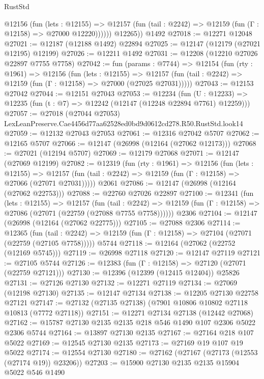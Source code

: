 \begin{lexlean}{RustStd}
\begin{coremodule}
            @12156
              (fun (lets : @12155) =>
              @12157 (fun (tail : @2242) => @12159 (fun (Γ : @12158) => @27000 @12220))))))
        @12265))
    @1492
@27018 := @12271 @12048
@27021 := @12187 (@12188 @1492) @22894
@27025 := @12147 (@12179 (@27021 @12195) @12199)
@27026 := @12211 @1492
@27031 := @12208 (@12210 @27026 @22897 @7755 @7758)
@27042 := fun (params : @7744) =>
  @12154
    (fun (rty : @1961) =>
    @12156
      (fun (lets : @12155) =>
      @12157 (fun (tail : @2242) => @12159 (fun (Γ : @12158) => @27000 (@27025 @27031)))))
@27043 := @12153 @27042
@27044 := @12151 @27043
@27053 := @12234
    (fun (U : @12233) => @12235 (fun (t : @7) => @12242 (@12147 (@12248 @22894 @7761) @12259)))
@27057 := @27018
    (@27044 @27053)
    LexLeanPreserve.Cae4456d77aa62528ed0bd9d0612cd278.R50.RustStd.look14
@27059 := @12132 @27043 @27053
@27061 := @12316 @27042 @5707
@27062 := @12165 @5707
@27066 := @12147 (@26998 (@12164 (@27062 @12173)))
@27068 := @27021 (@12194 @5707)
@27069 := @12179 @27068
@27071 := @12147 (@27069 @12199)
@27082 := @12319
    (fun (rty : @1961) =>
    @12156
      (fun (lets : @12155) =>
      @12157 (fun (tail : @2242) => @12159 (fun (Γ : @12158) => @27066 (@27071 @27031)))))
    @2061
@27086 := @12147 (@26998 (@12164 (@27062 @22753)))
@27088 := @22760 @27026 @22897
@27100 := @12341
    (fun (lets : @12155) =>
    @12157
      (fun (tail : @2242) =>
      @12159 (fun (Γ : @12158) => @27086 (@27071 (@22759 (@27088 @7755 @7758))))))
    @2306
@27104 := @12147 (@26998 (@12164 (@27062 @22775)))
@27105 := @27088 @2306
@27114 := @12365
    (fun (tail : @2242) => @12159 (fun (Γ : @12158) => @27104 (@27071 (@22759 (@27105 @7758)))))
    @5744
@27118 := @12164 (@27062 (@22752 (@12169 @5745)))
@27119 := @26998 @27118
@27120 := @12147 @27119
@27121 := @27105 @5744
@27126 := @12383 (fun (Γ : @12158) => @27120 (@27071 (@22759 @27121)))
@27130 := @12396 (@12399 (@12415 @12404)) @25826
@27131 := @27126 @27130
@27132 := @12271 @27119
@27134 := @27069 (@12198 @27130)
@27135 := @12147 @27134
@27138 := @12205 @27130 @22758 @27121
@27147 := @27132 (@27135 @27138) (@7901 @10806 @10802 @27118 @10813 (@7772 @27118))
@27151 := @12271 @27134 @27138 (@12442 @27068)
@27162 := @15787 @27130 @2135 @2135 @218 @546 @1490 @107 @2306 @5022 @2306 @5744
@27164 := @13897 @27130 @2135
@27167 := @27164 @218 @107 @5022
@27169 := @12545 @27130 @2135
@27173 := @27169 @19 @107 @19 @5022
@27174 := @12554 @27130
@27180 := @27162 (@27167 (@27173 (@12553 (@27174 @19)) @23206))
@27203 := @15900
    @27130
    @2135
    @2135
    @15904
    @5022
    @546
    @1490

\end{coremodule}
\end{lexlean}
